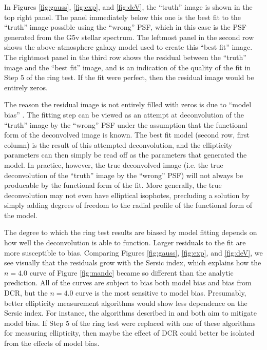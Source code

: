 \documentclass[apj]{emulateapj}
\begin{document}
In Figures \ref{fig:gauss}, \ref{fig:exp}, and \ref{fig:deV}, the
``truth'' image is shown in the top right panel.  The panel
immediately below this one is the best fit to the ``truth'' image
possible using the ``wrong'' PSF, which in this case is the PSF
generated from the G5v stellar spectrum.  The leftmost panel in the
second row shows the above-atmosphere galaxy model used to create this
``best fit'' image.  The rightmost panel in the third row shows the
residual between the ``truth'' image and the ``best fit'' image, and
is an indication of the quality of the fit in Step 5 of the ring test.
If the fit were perfect, then the residual image would be entirely
zeros.

The reason the residual image is not entirely filled with zeros is due
to ``model bias'' \citep{Voigt2010, Melchior2011, Bernstein2010}.  The
fitting step can be viewed as an attempt at deconvolution of the
``truth'' image by the ``wrong'' PSF under the assumption that the
functional form of the deconvolved image is known.  The best fit model
(second row, first column) is the result of this attempted
deconvolution, and the ellipticity parameters can then simply be read
off as the parameters that generated the model.  In practice, however,
the true deconvolved image (i.e. the true deconvolution of the
``truth'' image by the ``wrong'' PSF) will not always be producable by
the functional form of the fit.  More generally, the true
deconvolution may not even have elliptical isophotes, precluding a
solution by simply adding degrees of freedom to the radial profile of
the functional form of the model.

The degree to which the ring test results are biased by model fitting
depends on how well the deconvolution is able to function.  Larger
residuals to the fit are more susceptible to bias.  Comparing Figures
\ref{fig:gauss}, \ref{fig:exp}, and \ref{fig:deV}, we see visually
that the residuals grow with the Sersic index, which explains how the
$n=4.0$ curve of Figure \ref{fig:mandc} became so different than the
analytic prediction.  All of the curves are subject to bias both model
bias and bias from DCR, but the $n=4.0$ curve is the most sensitive to
model bias.  Presumably, better ellipticity measurement algorithms
would show less dependence on the Sersic index.  For instance, the
algorithms described in \citet{Bernstein2010} and \citet{Melchior2011}
both aim to mitigate model bias.  If Step 5 of the ring test were
replaced with one of these algorithms for measuring ellipticity, then
maybe the effect of DCR could better be isolated from the effects of
model bias.
\end{document}
